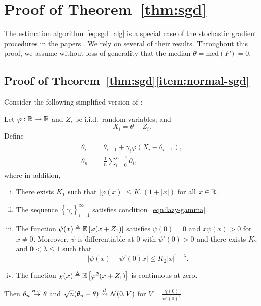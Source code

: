 \section{Proof of Theorem~\ref{thm:sgd}}
\label{proof:sgd}

The estimation algorithm~\eqref{eq:sgd_alg} is a special
case of the stochastic gradient procedures in the papers
\cite{PolyakJu92, polyak1990new}.
We rely on several of their results. Throughout this proof,
we assume without loss of generality that the median
$\theta = \mbox{med}(P) = 0$.

\subsection{Proof of Theorem~\ref{thm:sgd}\eqref{item:normal-sgd}}
\label{sec:proof-normal-sgd}

Consider the following simplified version of
\cite[Thm. 4]{polyak1992acceleration}:
\begin{corollary}{\cite[Thms. 3 \& 4]{PolyakJu92}}
  \label{corollary:polyak-juditsky}
  Let $\varphi : \mathbb{R} \to \mathbb{R}$ and $Z_i$ be i.i.d.\ random
  variables, and
  \begin{equation*}
  X_i = \theta + Z_i.
  \end{equation*}
  Define
  \begin{align}
    \begin{split}
      \theta_i & = \theta_{i-1} + \gamma_i \varphi(X_i - \theta_{i-1}), \\
      \bar{\theta}_n & = \frac{1}{n} \sum_{i=0}^{n-1} \theta_i, 
    \end{split}
    \label{eq:Polyak_Juditsky_alg}
  \end{align}
  where in addition,
  \begin{enumerate}[(i)]
  \item There exists $K_1$ such that $\left| \varphi(x) \right| \leq
    K_1(1+|x|)$ for all $x\in \mathbb{R}$.
  \item The sequence $\left\{ \gamma_i \right\}_{i=1}^\infty$ satisfies
    condition~\eqref{eqn:lazy-gamma}.
  \item \label{item:zero-gradient}
    The function $\psi(x) \triangleq \mathbb{E}\left[  \varphi(x+Z_1)\right]$
    satisfies $\psi(0) = 0$ and
    $x\psi(x) > 0$ for $x\neq 0$.  Moreover, $\psi$ is differentiable
    at 0 with $\psi'(0) > 0$ and there exists
    $K_2$ and $0 < \lambda \leq 1$ such that
    \begin{equation}
      \label{eqn:local-hessian-psi}
        \left| \psi(x) - \psi'(0)x \right|\leq K_2 |x|^{1+\lambda}.
    \end{equation}
  \item The function 
    $\chi(x) \triangleq \mathbb{E}\left[ \varphi^2(x+Z_1)\right]$ is continuous at zero. 
  \end{enumerate}
  Then $\bar{\theta}_n \stackrel{a.s.}{\rightarrow} \theta$ and $ \sqrt{n}({\theta}_n - \theta)
  \stackrel{d}{\rightsquigarrow} \mathcal{N}(0,V)$ for
  $V = \frac{ \chi(0)} {\psi'(0)^2}$.
\end{corollary}

